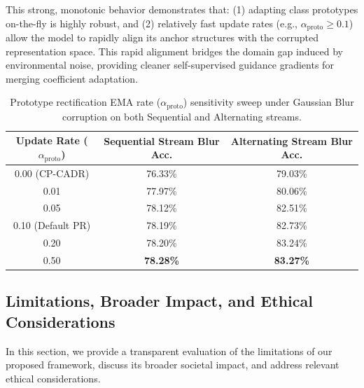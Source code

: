 \documentclass{article}
\theoremstyle{plain}
\theoremstyle{definition}
\theoremstyle{remark}
\begin{document}
This strong, monotonic behavior demonstrates that: (1) adapting class prototypes on-the-fly is highly robust, and (2) relatively fast update rates (e.g., $\alpha_{\text{proto}} \ge 0.1$) allow the model to rapidly align its anchor structures with the corrupted representation space. This rapid alignment bridges the domain gap induced by environmental noise, providing cleaner self-supervised guidance gradients for merging coefficient adaptation.

\begin{table}[h]
\caption{Prototype rectification EMA rate ($\alpha_{\text{proto}}$) sensitivity sweep under Gaussian Blur corruption on both Sequential and Alternating streams.}
\label{tab:pr_alpha}
\begin{center}
\begin{small}
\begin{tabular}{ccc}
\toprule
Update Rate ($\alpha_{\text{proto}}$) & Sequential Stream Blur Acc. & Alternating Stream Blur Acc. \\
\midrule
0.00 (CP-CADR) & 76.33\% & 79.03\% \\
0.01 & 77.97\% & 80.06\% \\
0.05 & 78.12\% & 82.51\% \\
0.10 (Default PR) & 78.19\% & 82.73\% \\
0.20 & 78.20\% & 83.24\% \\
0.50 & \textbf{78.28\%} & \textbf{83.27\%} \\
\bottomrule
\end{tabular}
\end{small}
\end{center}
\end{table}

\subsection{Limitations, Broader Impact, and Ethical Considerations}
\label{sec:app_limitations}
In this section, we provide a transparent evaluation of the limitations of our proposed framework, discuss its broader societal impact, and address relevant ethical considerations.
\end{document}
